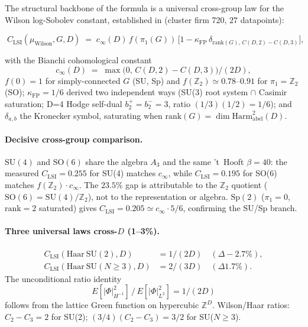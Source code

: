 \documentclass[aps,prl,reprint,superscriptaddress,floatfix,nofootinbib,amssymb]{revtex4-2}
\theoremstyle{definition}
\theoremstyle{remark}
\newcommand{\Z}{\mathbb{Z}}
\newcommand{\cinf}{c_{\infty}}
\newcommand{\CLSI}{C_{\mathrm{LSI}}}
\newcommand{\rk}{\mathrm{rank}}
\newcommand{\kFP}{\kappa_{\mathrm{FP}}}
\begin{document}
The structural backbone of the formula is a universal cross-group
law for the Wilson log-Sobolev constant, established in
\cite{RemondiereTheoremCv13_2026} (cluster firm 720, $27$
datapoints):
\begin{widetext}
\begin{equation}
\boxed{\;
\CLSI(\mu_{\mathrm{Wilson}}, G, D)
\;=\; \cinf(D)\,f(\pi_{1}(G))\,
\bigl[1 - \kFP\,\delta_{\rk(G),\,C(D,2)-C(D,3)}\bigr],
\;}
\label{eq:cross-group}
\end{equation}
\end{widetext}
with the Bianchi cohomological constant
\begin{equation}
\cinf(D) \;=\; \max\!\bigl(0,\,C(D,2)-C(D,3)\bigr)\big/(2D),
\label{eq:cinf}
\end{equation}
$f(0)=1$ for simply-connected $G$ (SU, Sp) and
$f(\Z_{2})\simeq 0.78$--$0.91$ for $\pi_{1}=\Z_{2}$ (SO);
$\kFP=1/6$ derived two independent ways
(SU(3) root system $\cap$ Casimir saturation; D=4 Hodge self-dual
$b_{2}^{+}=b_{2}^{-}=3$, ratio $(1/3)(1/2)=1/6$); and $\delta_{a,b}$
the Kronecker symbol, saturating when
$\rk(G)=\dim\mathrm{Harm}^{2}_{\mathrm{abel}}(D)$.

\paragraph{Decisive cross-group comparison.}
$\mathrm{SU}(4)$ and $\mathrm{SO}(6)$ share the algebra $A_{3}$ and
the same 't~Hooft $\beta=40$: the measured
$\CLSI=0.255$ for SU(4) matches $\cinf$, while
$\CLSI=0.195$ for SO(6) matches $f(\Z_{2})\cdot\cinf$. The
$23.5\%$ gap is attributable to the $\Z_{2}$ quotient
($\mathrm{SO}(6)=\mathrm{SU}(4)/\Z_{2}$), not to the representation or
algebra. $\mathrm{Sp}(2)$ ($\pi_{1}=0$, $\rk=2$ saturated) gives
$\CLSI=0.205\simeq \cinf\cdot 5/6$, confirming the SU/Sp branch.

\paragraph{Three universal laws cross-$D$ (1--3\%).}
\begin{align}
\CLSI(\mathrm{Haar~SU}(2), D) &= 1/(2D)
\quad (\Delta -2.7\%),\\
\CLSI(\mathrm{Haar~SU}(N{\geq}3), D) &= 2/(3D)
\quad (\Delta 1.7\%).
\end{align}
The unconditional ratio identity
\begin{equation}
\boxed{\;E[|\Phi|^{2}_{H^{-1}}]\,/\,E[|\Phi|^{2}_{L^{2}}]
= 1/(2D)\;}
\label{eq:hminus1}
\end{equation}
follows from the lattice Green function on hypercubic $\Z^{D}$.
Wilson/Haar ratios: $C_{2}-C_{3}=2$ for SU(2);
$(3/4)(C_{2}-C_{3})=3/2$ for SU($N{\geq}3$).
\end{document}
